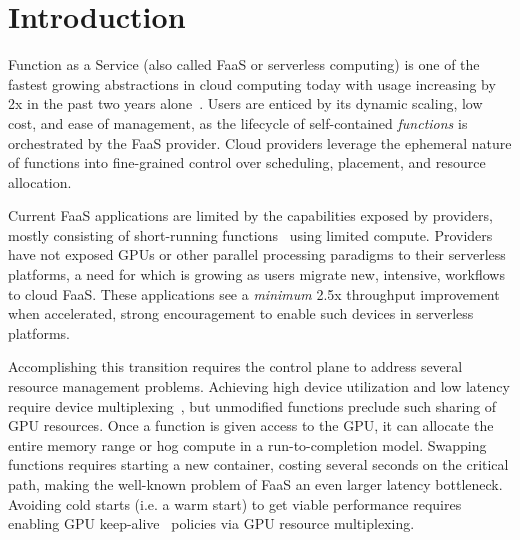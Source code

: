 \section{Introduction}

Function as a Service (also called FaaS or serverless computing) is one of the fastest growing abstractions in cloud computing today with usage increasing by 2x in the past two years alone~\cite{wen2023rise}.
Users are enticed by its dynamic scaling, low cost, and ease of management, as the lifecycle of self-contained \textit{functions} is orchestrated by the FaaS provider.
Cloud providers leverage the ephemeral nature of functions into fine-grained control over scheduling, placement, and resource allocation.

Current FaaS applications are limited by the capabilities exposed by providers, mostly consisting of short-running functions~\cite{shahrad2020serverless} using limited compute.
Providers have not exposed GPUs or other parallel processing paradigms to their serverless platforms, a need for which is growing as users migrate new, intensive, workflows to cloud FaaS.
These applications see a \emph{minimum} 2.5x throughput improvement when accelerated, strong encouragement to enable such devices in serverless platforms.

Accomplishing this transition requires the control plane to address several resource management problems.
Achieving high device utilization and low latency require device multiplexing~\cite{pemberton2022kernel, ng2023paella, fingler2022dgsf, gu2023fast}, but unmodified functions preclude such sharing of GPU resources.
Once a function is given access to the GPU, it can allocate the entire memory range or hog compute in a run-to-completion model.
Swapping functions requires starting a new container, costing several seconds on the critical path, making the well-known  problem of FaaS an even larger latency bottleneck.
Avoiding cold starts (i.e. a warm start) to get viable performance requires enabling GPU keep-alive~\cite{faascache-asplos21} policies via GPU resource multiplexing.

